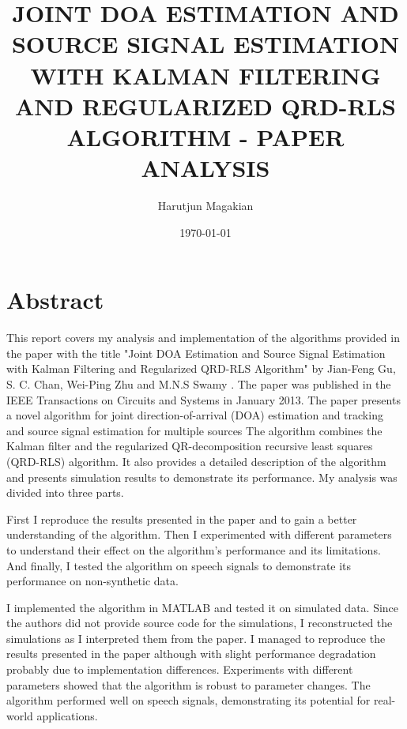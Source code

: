 \documentclass{article}
\begin{document}
\sectionfont{\bfseries\uppercase}
\title{\textbf{\uppercase{JOINT DOA ESTIMATION AND SOURCE SIGNAL ESTIMATION WITH KALMAN FILTERING AND REGULARIZED QRD-RLS ALGORITHM - Paper Analysis}}}
\author{Harutjun Magakian}
\date{\today}
\maketitle


\section{Abstract}



This report covers my analysis and implementation of the algorithms provided in the paper with the title "Joint DOA Estimation and Source Signal Estimation with Kalman Filtering and Regularized QRD-RLS Algorithm"
by Jian-Feng Gu, S. C. Chan, Wei-Ping Zhu and M.N.S Swamy \cite{DOA_Kalman_RQRDRLS}.
The paper was published in the IEEE Transactions on Circuits and Systems in January 2013.
The paper presents a novel algorithm for joint direction-of-arrival (DOA) estimation and tracking and source signal estimation for multiple sources
The algorithm combines the Kalman filter and the regularized QR-decomposition recursive least squares (QRD-RLS) algorithm. It also provides a detailed description of the algorithm and presents simulation results to demonstrate its performance.
My analysis was divided into three parts.

First I reproduce the results presented in the paper and to gain a better understanding of the algorithm.
Then I experimented with different parameters to understand their effect on the algorithm's performance and its limitations.
And finally, I tested the algorithm on speech signals to demonstrate its performance on non-synthetic data.

I implemented the algorithm in MATLAB and tested it on simulated data.
Since the authors did not provide source code for the simulations, I reconstructed the simulations as I interpreted them from the paper.
I managed to reproduce the results presented in the paper although with slight performance degradation probably due to implementation differences.
Experiments with different parameters showed that the algorithm is robust to parameter changes.
The algorithm performed well on speech signals, demonstrating its potential for real-world applications.


\end{document}
